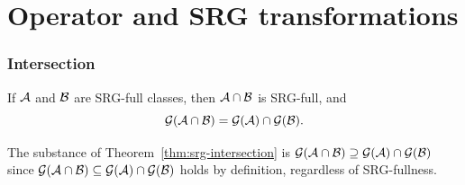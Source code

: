 \documentclass[10pt,mathserif]{beamer}
\begin{document}
\section{Operator and SRG transformations}




\begin{frame}
\frametitle{Intersection}
\begin{theorem} \label{thm:srg-intersection}
If ${\mathcal{A}}$ and ${\mathcal{B}}$ are SRG-full classes, then  ${\mathcal{A}}\cap {\mathcal{B}}$ is SRG-full, and
\[
{\mathcal{G}}({\mathcal{A}}\cap \mathcal{B})={\mathcal{G}}({\mathcal{A}})\cap {\mathcal{G}}(\mathcal{B}).
\]
\end{theorem}

\vspace{0.2in}

The substance of Theorem~\ref{thm:srg-intersection} is ${\mathcal{G}}({\mathcal{A}}\cap \mathcal{B})\supseteq{\mathcal{G}}({\mathcal{A}})\cap {\mathcal{G}}(\mathcal{B})$ since ${\mathcal{G}}({\mathcal{A}}\cap \mathcal{B})\subseteq {\mathcal{G}}({\mathcal{A}})\cap {\mathcal{G}}(\mathcal{B})$ holds by definition, regardless of SRG-fullness.
\end{frame}
\end{document}
